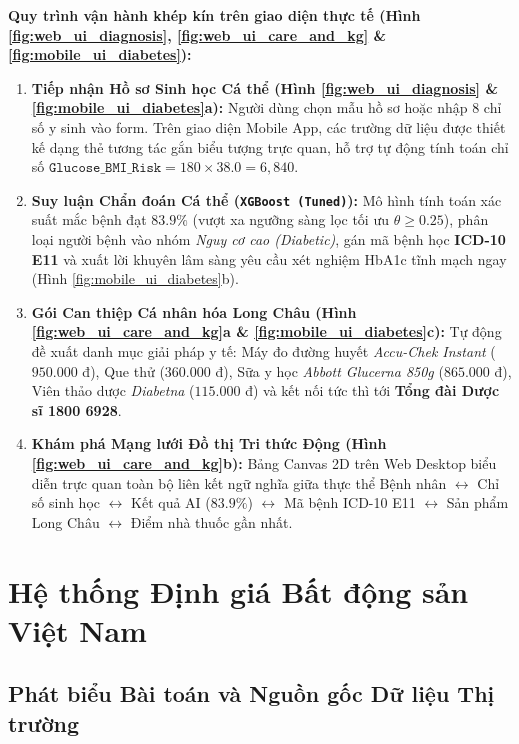\documentclass[12pt,a4paper]{report}
\begin{document}
\textbf{Quy trình vận hành khép kín trên giao diện thực tế (Hình \ref{fig:web_ui_diagnosis}, \ref{fig:web_ui_care_and_kg} \& \ref{fig:mobile_ui_diabetes}):}
\begin{enumerate}[leftmargin=1.5em]
    \item \textbf{Tiếp nhận Hồ sơ Sinh học Cá thể (Hình \ref{fig:web_ui_diagnosis} \& \ref{fig:mobile_ui_diabetes}a):} Người dùng chọn mẫu hồ sơ hoặc nhập 8 chỉ số y sinh vào form. Trên giao diện Mobile App, các trường dữ liệu được thiết kế dạng thẻ tương tác gắn biểu tượng trực quan, hỗ trợ tự động tính toán chỉ số $\texttt{Glucose\_BMI\_Risk} = 180 \times 38.0 = 6,840$.
    \item \textbf{Suy luận Chẩn đoán Cá thể (\texttt{XGBoost (Tuned)}):} Mô hình tính toán xác suất mắc bệnh đạt $\mathbf{83.9\%}$ (vượt xa ngưỡng sàng lọc tối ưu $\theta \ge 0.25$), phân loại người bệnh vào nhóm \textit{Nguy cơ cao (Diabetic)}, gán mã bệnh học \textbf{ICD-10 E11} và xuất lời khuyên lâm sàng yêu cầu xét nghiệm HbA1c tĩnh mạch ngay (Hình \ref{fig:mobile_ui_diabetes}b).
    \item \textbf{Gói Can thiệp Cá nhân hóa Long Châu (Hình \ref{fig:web_ui_care_and_kg}a \& \ref{fig:mobile_ui_diabetes}c):} Tự động đề xuất danh mục giải pháp y tế: Máy đo đường huyết \textit{Accu-Chek Instant} ($950.000$ đ), Que thử ($360.000$ đ), Sữa y học \textit{Abbott Glucerna 850g} ($865.000$ đ), Viên thảo dược \textit{Diabetna} ($115.000$ đ) và kết nối tức thì tới \textbf{Tổng đài Dược sĩ 1800 6928}.
    \item \textbf{Khám phá Mạng lưới Đồ thị Tri thức Động (Hình \ref{fig:web_ui_care_and_kg}b):} Bảng Canvas 2D trên Web Desktop biểu diễn trực quan toàn bộ liên kết ngữ nghĩa giữa thực thể Bệnh nhân $\longleftrightarrow$ Chỉ số sinh học $\longleftrightarrow$ Kết quả AI ($83.9\%$) $\longleftrightarrow$ Mã bệnh ICD-10 E11 $\longleftrightarrow$ Sản phẩm Long Châu $\longleftrightarrow$ Điểm nhà thuốc gần nhất.
\end{enumerate}

\chapter{Hệ thống Định giá Bất động sản Việt Nam}

\section{Phát biểu Bài toán và Nguồn gốc Dữ liệu Thị trường}
\end{document}

